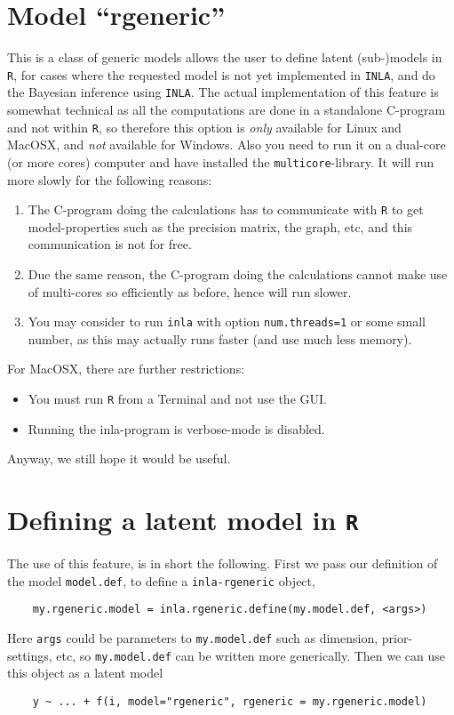\documentclass[a4paper,11pt]{article}
\begin{document}
\section*{Model ``rgeneric''}


This is a class of generic models allows the user to define latent
(sub-)models in \texttt{R}, for cases where the requested model is not
yet implemented in \texttt{INLA}, and do the Bayesian inference using
\texttt{INLA}. 
The actual implementation of this feature is somewhat technical as all
the computations are done in a standalone C-program and not within
\texttt{R}, so therefore this option is \emph{only} available for
Linux and MacOSX, and \emph{not} available for Windows. Also you need
to run it on a dual-core (or more cores) computer and have installed
the \texttt{multicore}-library. It will run more slowly for the
following reasons:
\begin{enumerate}
\item The C-program doing the calculations has to communicate with
    \texttt{R} to get model-properties such as the precision matrix,
    the graph, etc, and this communication is not for free.
\item Due the same reason, the C-program doing the calculations cannot
    make use of multi-cores so efficiently as before, hence will run
    slower.
\item You may consider to run \texttt{inla} with option
    \texttt{num.threads=1} or some small number, as this may actually
    runs faster (and use much less memory).
\end{enumerate}
For MacOSX, there are further restrictions:
\begin{itemize}
\item You must run \texttt{R} from a Terminal and not use the GUI.
\item Running the inla-program is verbose-mode is disabled.
\end{itemize}
Anyway, we still hope it would be useful.

\section*{Defining a latent model in \texttt{R}}

The use of this feature, is in short the following. First we pass our
definition of the model \texttt{model.def}, to define a
\texttt{inla-rgeneric} object,
\begin{verbatim}
    my.rgeneric.model = inla.rgeneric.define(my.model.def, <args>)
\end{verbatim}
Here \texttt{args} could be parameters to \texttt{my.model.def}
such as dimension, prior-settings, etc, so \texttt{my.model.def} can
be written more generically.  Then we can use this object as a latent
model
\begin{verbatim}
    y ~ ... + f(i, model="rgeneric", rgeneric = my.rgeneric.model)
\end{verbatim}
\end{document}

